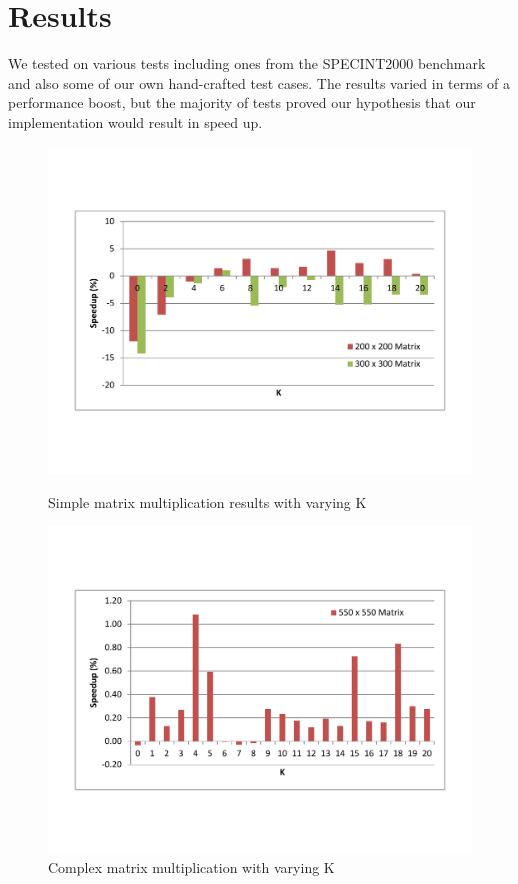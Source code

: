 \documentclass[11pt]{article}
\begin{document}
  \section{Results}
  We tested on various tests including ones from the SPECINT2000 benchmark and also some of our own hand-crafted test cases. The results varied in terms of a performance boost, but the majority of tests proved our hypothesis that our implementation would result in speed up. 
  \begin{figure}[h]
    \begin{minipage} [t] {8.6cm}
      \includegraphics[scale=0.35]{./results/test_matrix1}
      \caption{Simple matrix multiplication results with varying K\label{test_matrix1}}
    \end{minipage}
    \begin{minipage} [t] {8.5cm}
      \includegraphics[scale=0.35]{./results/test_matrix3}
      \caption{Complex matrix multiplication with varying K\label{test_matrix3}}
    \end{minipage}
  \end{figure} 
\end{document}

